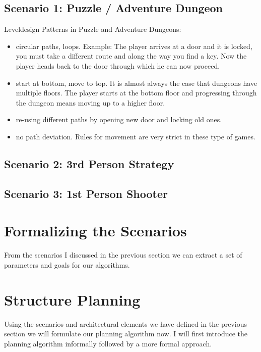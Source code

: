 \subsection{Scenario 1: Puzzle / Adventure Dungeon}
Leveldesign Patterns in Puzzle and Adventure Dungeons:

\begin{itemize}
\item circular paths, loops. Example: The player arrives at a door and it is locked, you must take a different route and along the way you find a key. Now the player heads back to the door through which he can now proceed.  
\item start at bottom, move to top. It is almost always the case that dungeons have multiple floors. The player starts at the bottom floor and progressing through the dungeon means moving up to a higher floor.      
\item re-using different paths by opening new door and locking old ones.    
\item no path deviation. Rules for movement are very strict in these type of games.

\end{itemize}

\subsection{Scenario 2: 3rd Person Strategy}



\subsection{Scenario 3: 1st Person Shooter}

	
\section{Formalizing the Scenarios}

From the scenarios I discussed in the previous section we can extract a set of parameters and goals for our algorithms.
 
\section{Structure Planning}
\label{sec:PlanningAlgorithm} 
  
 Using the scenarios and architectural elements we have defined in the previous section we will formulate our planning algorithm now.
 I will first introduce the planning algorithm informally followed by a more formal approach.
      
